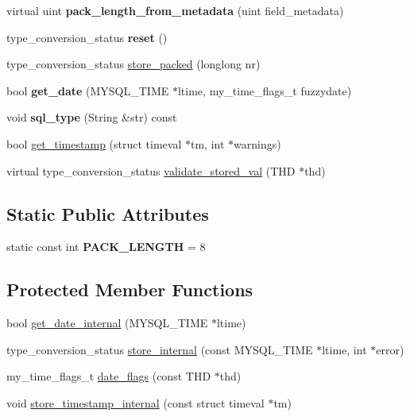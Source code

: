 \begin{DoxyCompactItemize}
virtual uint {\bfseries pack\+\_\+length\+\_\+from\+\_\+metadata} (uint field\+\_\+metadata)
\item 
\mbox{\label{classField__timestampf_a8be406c1455238c9db306911bb7a63cb}} 
type\+\_\+conversion\+\_\+status {\bfseries reset} ()
\item 
type\+\_\+conversion\+\_\+status \mbox{\hyperlink{classField__timestampf_ae2dfad15c21906d8651e3f52bdc6c263}{store\+\_\+packed}} (longlong nr)
\item 
\mbox{\label{classField__timestampf_a7fb0029e40ba7cbe3bd195dea93c0883}} 
bool {\bfseries get\+\_\+date} (M\+Y\+S\+Q\+L\+\_\+\+T\+I\+ME $\ast$ltime, my\+\_\+time\+\_\+flags\+\_\+t fuzzydate)
\item 
\mbox{\label{classField__timestampf_a84ab907aa62b8e9137a11e4de403261b}} 
void {\bfseries sql\+\_\+type} (String \&str) const
\item 
bool \mbox{\hyperlink{classField__timestampf_a72149682778248e2084a68f08738c3a6}{get\+\_\+timestamp}} (struct timeval $\ast$tm, int $\ast$warnings)
\item 
virtual type\+\_\+conversion\+\_\+status \mbox{\hyperlink{classField__timestampf_a3a96ed01920259945daf2744367a94f1}{validate\+\_\+stored\+\_\+val}} (T\+HD $\ast$thd)
\end{DoxyCompactItemize}
\subsection*{Static Public Attributes}
\begin{DoxyCompactItemize}
\item 
\mbox{\label{classField__timestampf_ac08fd88f7e7b21f1b53af91670f65db0}} 
static const int {\bfseries P\+A\+C\+K\+\_\+\+L\+E\+N\+G\+TH} = 8
\end{DoxyCompactItemize}
\subsection*{Protected Member Functions}
\begin{DoxyCompactItemize}
\item 
bool \mbox{\hyperlink{classField__timestampf_a2f546414955a5ad516e77dc821ff5f47}{get\+\_\+date\+\_\+internal}} (M\+Y\+S\+Q\+L\+\_\+\+T\+I\+ME $\ast$ltime)
\item 
type\+\_\+conversion\+\_\+status \mbox{\hyperlink{classField__timestampf_a383fd42f33dd3a95ecccb841a7209fdb}{store\+\_\+internal}} (const M\+Y\+S\+Q\+L\+\_\+\+T\+I\+ME $\ast$ltime, int $\ast$error)
\item 
my\+\_\+time\+\_\+flags\+\_\+t \mbox{\hyperlink{classField__timestampf_a68ee4c735131162fc015b789c89dba64}{date\+\_\+flags}} (const T\+HD $\ast$thd)
\item 
void \mbox{\hyperlink{classField__timestampf_a93e60b040799d30057489d11e3c65676}{store\+\_\+timestamp\+\_\+internal}} (const struct timeval $\ast$tm)
\end{DoxyCompactItemize}
